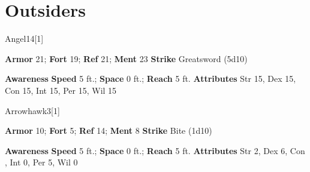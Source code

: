 \section{Outsiders}
\begin{monsection}{Angel}{14}[1]
\vspace{-1em}\vspace{-1em}
\begin{spellcontent}
\begin{spelltargetinginfo}
\pari \textbf{Armor} 21; \textbf{Fort} 19; \textbf{Ref} 21; \textbf{Ment} 23
\pari \textbf{Strike} Greatsword  (5d10)
\end{spelltargetinginfo}
\end{spellcontent}
\begin{spellsubcontent}
\begin{spellfooter}
\pari \textbf{Awareness} 
\pari \textbf{Speed} 5 ft.; \textbf{Space} 0 ft.; \textbf{Reach} 5 ft.
\pari \textbf{Attributes} Str 15, Dex 15, Con 15, Int 15, Per 15, Wil 15
\end{spellfooter}
\end{spellsubcontent}
\end{monsection}
\begin{monsection}{Arrowhawk}{3}[1]
\vspace{-1em}\vspace{-1em}
\begin{spellcontent}
\begin{spelltargetinginfo}
\pari \textbf{Armor} 10; \textbf{Fort} 5; \textbf{Ref} 14; \textbf{Ment} 8
\pari \textbf{Strike} Bite  (1d10)
\end{spelltargetinginfo}
\end{spellcontent}
\begin{spellsubcontent}
\begin{spellfooter}
\pari \textbf{Awareness} 
\pari \textbf{Speed} 5 ft.; \textbf{Space} 0 ft.; \textbf{Reach} 5 ft.
\pari \textbf{Attributes} Str 2, Dex 6, Con , Int 0, Per 5, Wil 0
\end{spellfooter}
\end{spellsubcontent}
\end{monsection}
